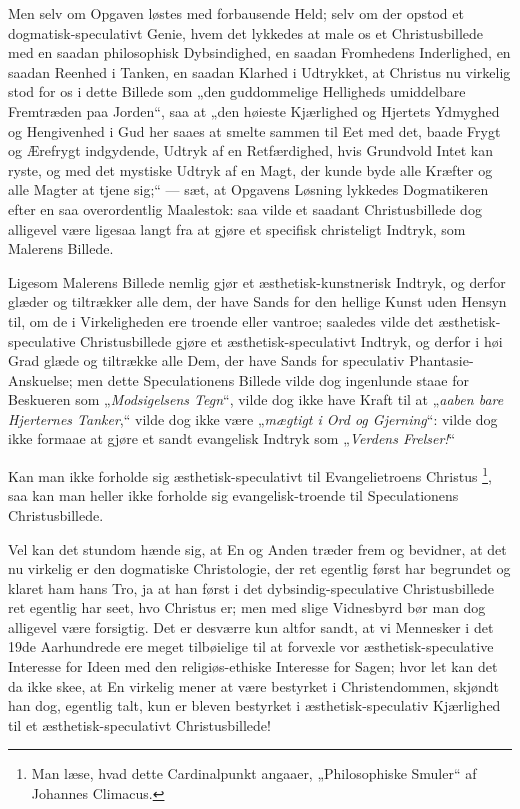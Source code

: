 \documentclass[12pt,a4paper]{book}
\newcommand{\opage}[1]{\marginnote{\footnotesize\textit{[#1]}}}
\begin{document}
Men selv om Opgaven løstes med forbausende Held; selv om der opstod et
dogmatisk-speculativt Genie, hvem det lykkedes at male os et
Christusbillede med en saadan philosophisk Dybsindighed, en saadan
Fromhedens Inderlighed, en saadan Reenhed i Tanken, en saadan Klarhed i
Udtrykket, at Christus nu virkelig stod for os i dette Billede som „den
guddommelige Helligheds umiddelbare Fremtræden paa Jorden“, saa at „den
høieste Kjærlighed og Hjertets Ydmyghed og Hengivenhed i Gud her saaes at
smelte sammen til Eet med det, baade Frygt og Ærefrygt indgydende, Udtryk
af en Retfærdighed, hvis Grundvold Intet kan ryste, og med det mystiske
Udtryk af en Magt, der kunde byde alle Kræfter og alle Magter at tjene
sig;“ --- sæt, at Opgavens Løsning lykkedes Dogmatikeren efter en saa
overordentlig Maalestok: saa vilde et saadant Christusbillede dog alligevel
være ligesaa langt fra at gjøre et specifisk christeligt Indtryk, som
Malerens Billede.

Ligesom Malerens Billede nemlig gjør et æsthetisk-kunstnerisk Indtryk, og
derfor glæder og tiltrækker alle dem, der have Sands for den hellige Kunst
uden Hensyn til, om de i Virkeligheden ere troende eller vantroe; saaledes
vilde det æsthetisk-speculative Christusbillede gjøre et
æsthetisk-speculativt Indtryk, og derfor i høi Grad glæde og tiltrække alle
Dem, der have Sands for speculativ Phantasie-Anskuelse; men dette
Speculationens Billede vilde dog ingenlunde staae for Beskueren som
„\emph{Modsigelsens Tegn}“, vilde dog ikke have Kraft til at
„\emph{aaben\-%
\opage{110}bare Hjerternes Tanker},“
vilde dog ikke være „\emph{mægtigt i Ord og
Gjerning}“: vilde dog ikke formaae at gjøre et sandt evangelisk Indtryk som
„\emph{Verdens Frelser!}“

Kan man ikke forholde sig æsthetisk-speculativt til Evangelietroens
Christus%
\footnote{Man læse, hvad dette Cardinalpunkt angaaer, „Philosophiske
Smuler“ af Johannes Climacus.}, saa kan man heller ikke forholde sig
evangelisk-troende til Speculationens Christusbillede.

Vel kan det stundom hænde sig, at En og Anden træder frem og bevidner, at
det nu virkelig er den dogmatiske Christologie, der ret egentlig først har
begrundet og klaret ham hans Tro, ja at han først i det
dybsindig-speculative Christusbillede ret egentlig har seet, hvo Christus
er; men med slige Vidnesbyrd bør man dog alligevel være forsigtig. Det er
desværre kun altfor sandt, at vi Mennesker i det 19de Aarhundrede ere meget
tilbøielige til at forvexle vor æsthetisk-speculative Interesse for Ideen
med den religiøs-ethiske Interesse for Sagen; hvor let kan det da ikke
skee, at En virkelig mener at være bestyrket i Christendommen, skjøndt han
dog, egentlig talt, kun er bleven bestyrket i æsthetisk-speculativ
Kjærlighed til et æsthetisk-speculativt Christusbillede!
\end{document}
